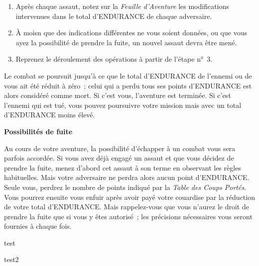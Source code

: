 \documentclass[10pt]{book}
\begin{document}
\begin{enumerate}
  \item Après chaque assaut, notez sur la \textit{Feuille d'Aventure} les modifications
  intervenues dans le total d'ENDURANCE de chaque adversaire.

  \item À moisn que des indications différentes ne vous soient données, ou que vous
  ayez la possibilité de prendre la fuite, un nouvel assaut devra être mené.

  \item Reprenez le déroulement des opérations à partir de l'étape n°~3.
\end{enumerate}

Le combat se poursuit jusqu'à ce que le total d'ENDURANCE de l'ennemi ou de vous
ait été réduit à zéro~; celui qui a perdu tous ses points d'ENDURANCE est alors
considéré comme mort. Si c'est vous, l'aventure est terminée. Si c'est l'ennemi
qui est tué, vous pouvez poursuivre votre mission mais avec un total d'ENDURANCE
moins élevé.

\begin{center}
  \textbf{Possibilités de fuite}
\end{center}
Au cours de votre aventure, la possibilité d'échapper à un combat vous sera parfois
accordée. Si vous avez déjà engagé un assaut et que vous décidez de prendre la fuite,
menez d'abord cet assaut à son terme en observant les règles habituelles. Mais votre
adversaire ne perdra alors aucun point d'ENDURANCE. Seule vous, perdrez le nombre
de points indiqué par la \textit{Table des Coups Portés}. Vous pourrez ensuite vous
enfuir après avoir payé votre couardise par la réduction de votre total d'ENDURANCE.
Mais rappelez-vous que vous n'aurez le droit de prendre la fuite que si vous y êtes
autorisé~; les précisions nécessaires vous seront fournies à chaque fois.



\mainmatter
\pagestyle{mainmatterstyle}

test

\newpage

test2

\newpage
\end{document}
